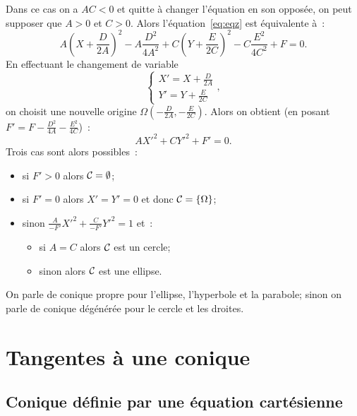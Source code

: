 Dans ce cas on a \(AC<0\) et quitte à changer l'équation en son opposée, on 
peut supposer que \(A>0\) et \(C>0\). Alors l'équation~\eqref{eq:eqz} est 
équivalente à~:
\begin{equation}
  A\left(X + \frac{D}{2A}\right)^2 -A\frac{D^2}{4A^2} + 
  C\left(Y + \frac{E}{2C}\right)^2 -C\frac{E^2}{4C^2} + F = 0.
\end{equation}
En effectuant le changement de variable
\begin{equation}
  \begin{cases}
    X' = X + \frac{D}{2A}\\Y' = Y + \frac{E}{2C}
  \end{cases},
\end{equation}
on choisit une nouvelle origine 
\(\Omega\left(-\frac{D}{2A},-\frac{E}{2C}\right)\). Alors on obtient (en 
posant \(F' = F-\frac{D^2}{4A}-\frac{E^2}{4C}\))~:
\begin{equation}
  AX'^2 + CY'^2 + F' = 0.
\end{equation}
Trois cas sont alors possibles~:
\begin{itemize}
  \item si \(F'>0\) alors \(\mathcal{C}_{{}} = \emptyset\);
  \item si \(F' = 0\) alors \(X' = Y' = 0\) et donc \(\mathcal{C}_{{}} = \{\Omega\}\);
  \item sinon \(\frac{A}{-F'}X'^2 + \frac{C}{-F'}Y'^2 = 1\) et~:
    \begin{itemize}
      \item si \(A = C\) alors \(\mathcal{C}_{{}}\) est un cercle;
      \item sinon alors \(\mathcal{C}_{{}}\) est une ellipse.
    \end{itemize}
\end{itemize}
On parle de conique propre pour l'ellipse, l'hyperbole et la parabole; sinon 
on parle de conique dégénérée pour le cercle et les droites.

\section{Tangentes à une conique}

\subsection{Conique définie par une équation cartésienne}

